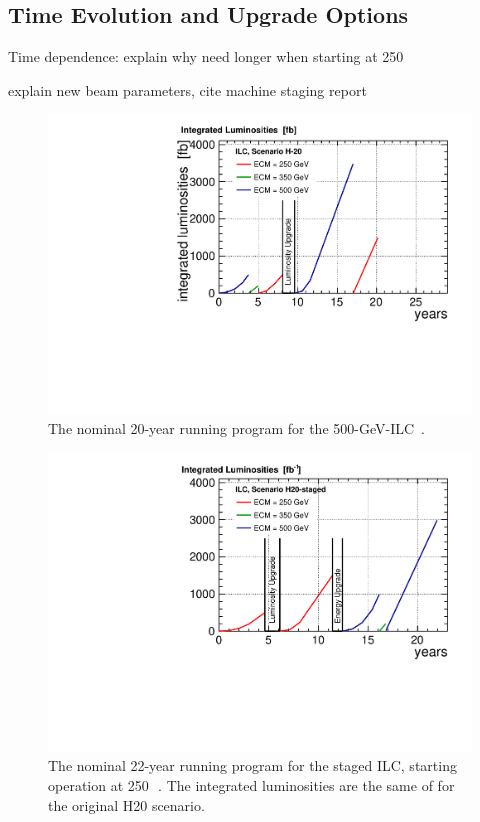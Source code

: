\subsection{Time Evolution and Upgrade Options}
{\color{red} Time dependence: explain why need longer when starting at 250\,\GeV}

{\color{red} explain new beam parameters, cite machine staging report}


\begin{figure}
\begin{center}
\includegraphics[width=0.75\hsize]{chapters/figures/lumi_H-20.pdf}
\end{center}
\caption{The nominal 20-year running program for the 500-GeV-ILC~\cite{Barklow:2015tja}.}
\label{fig:H20}
\end{figure}

\begin{figure}
\begin{center}
\includegraphics[width=0.75\hsize]{chapters/figures/lumi_H20-staged}
\end{center}
\caption{The nominal 22-year running program for the staged ILC, starting operation at 250\,\GeV ~\cite{Fujii:2017vwa}. The integrated luminosities are the same of for the original H20 scenario.}
\label{fig:H20staged}
\end{figure}
